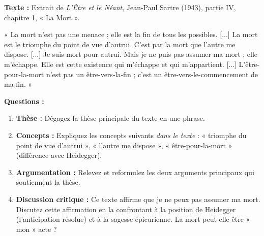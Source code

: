\documentclass[11pt]{article}
\begin{document}
\begin{exercice}
\textbf{Texte :} Extrait de \emph{L'Être et le Néant}, Jean-Paul Sartre (1943), partie IV, chapitre 1, « La Mort ».

\vspace{0.2cm}
\noindent « La mort n'est pas une menace ; elle est la fin de tous les possibles. [...] La mort est le triomphe du point de vue d'autrui. C'est par la mort que l'autre me dispose. [...] Je suis mort pour autrui. Mais je ne puis pas assumer ma mort ; elle m'échappe. Elle est cette existence qui m'échappe et qui m'appartient. [...] L'être-pour-la-mort n'est pas un être-vers-la-fin ; c'est un être-vers-le-commencement de ma fin. »

\vspace{0.3cm}
\noindent \textbf{Questions :}
\begin{enumerate}
\item \textbf{Thèse :} Dégagez la thèse principale du texte en une phrase.
\item \textbf{Concepts :} Expliquez les concepts suivants \emph{dans le texte} : « triomphe du point de vue d'autrui », « l'autre me dispose », « être-pour-la-mort » (différence avec Heidegger).
\item \textbf{Argumentation :} Relevez et reformulez les deux arguments principaux qui soutiennent la thèse.
\item \textbf{Discussion critique :} Ce texte affirme que je ne peux pas assumer ma mort. Discutez cette affirmation en la confrontant à la position de Heidegger (l'anticipation résolue) et à la sagesse épicurienne. La mort peut-elle être « mon » acte ?
\end{enumerate}
\end{exercice}
\end{document}
